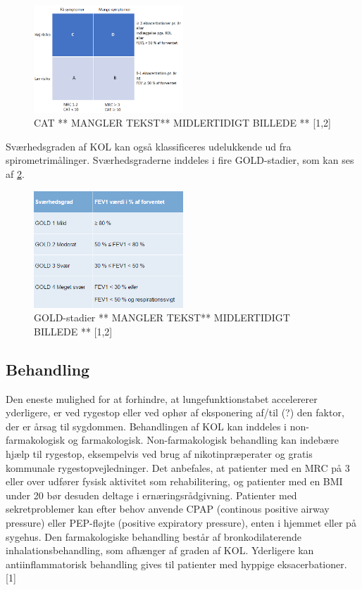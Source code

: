\begin{figure} [H]
\centering
\includegraphics[width=0.5\textwidth]{figures/CAT}
\caption{CAT ** MANGLER TEKST** MIDLERTIDIGT BILLEDE ** [1,2]}
\label{fig:CAT}
\end{figure} 

Sværhedsgraden af KOL kan også klassificeres udelukkende ud fra spirometrimålinger. Sværhedsgraderne inddeles i fire GOLD-stadier, som kan ses af \ref{fig:GOLD}.

\begin{figure} [H]
\centering
\includegraphics[width=0.5\textwidth]{figures/GOLD}
\caption{GOLD-stadier ** MANGLER TEKST** MIDLERTIDIGT BILLEDE ** [1,2]}
\label{fig:GOLD}
\end{figure} 

\subsection{Behandling}
Den eneste mulighed for at forhindre, at lungefunktionstabet accelererer yderligere, er ved rygestop eller ved ophør af eksponering af/til (?) den faktor, der er årsag til sygdommen.
Behandlingen af KOL kan inddeles i non-farmakologisk og farmakologisk. Non-farmakologisk behandling kan indebære hjælp til rygestop, eksempelvis ved brug af nikotinpræperater og gratis kommunale rygestopvejledninger. Det anbefales, at patienter med en MRC på 3 eller over udfører fysisk aktivitet som rehabilitering, og patienter med en BMI under 20 bør desuden deltage i ernæringsrådgivning. Patienter med sekretproblemer kan efter behov anvende CPAP (continous positive airway pressure) eller PEP-fløjte (positive expiratory pressure), enten i hjemmet eller på sygehus.
Den farmakologiske behandling består af bronkodilaterende inhalationsbehandling, som afhænger af graden af KOL. Yderligere kan antiinflammatorisk behandling gives til patienter med hyppige eksacerbationer. [1]
 

